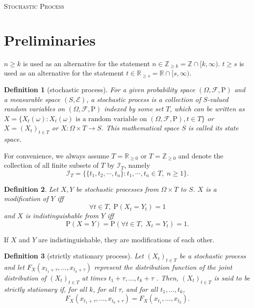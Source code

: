\documentclass{article}
\newtheorem{definition}{Definition}[section]
\theoremstyle{nonumberplain}
\begin{document}
	\begin{center}
	\textsc{\Huge Stochastic Process}	
\end{center}
\vspace{1em} 
\tableofcontents
\section{Preliminaries}
$n \ge k$ is used as an alternative for the
statement $n\in\mathbb{Z}_{\ge k}=\mathbb{Z}\cap[k,\infty)$. $t \ge s$ is used as an alternative for the statement $t\in\mathbb{R}_{\ge s}=\mathbb{R}\cap[s,\infty)$.
\begin{definition}[stochastic process]
For a given probability space $(\Omega ,{\mathcal{F}},\mathrm{P})$ and a measurable space $(S,\mathcal{E})$, a \emph{stochastic process} is a collection of $S$-valued random variables on $(\Omega ,{\mathcal{F}},\mathrm{P})$ indexed by some set $T$, which can be written as $X=\{X_t(\omega):X_t(\omega)\text{ is a random variable on } (\Omega ,\mathcal{F},\mathrm{P}),t\in T\}$ or $X=(X_t)_{t\in T}$ or $X:\Omega \times T\rightarrow S$. This mathematical space $S$ is called its state space. 
\end{definition}

For convenience, we always assume $T=\mathbb{R}_{\ge 0}$ or $T=\mathbb{Z}_{\ge 0}$ and denote the collection of all finite subsets of $T$ by $\mathcal{I}_T$, namely
\[
\mathcal{I}_T=\{\{t_1,t_2,\cdots,t_n\}:t_1,\cdots,t_n\in T,\;n\ge 1\}.
\]

\begin{definition}
Let $X, Y$ be stochastic processes from $\Omega\times T$ to $S$.
$X$ is a \emph{modification} of $Y$ iff
\[
\forall t \in T,\; \mathrm{P}(X_t=Y_t)=1
\]
and $X$ is \emph{indistinguishable} from $Y$ iff
\[
\mathrm{P}(X=Y)=\mathrm{P}(\forall t \in T,\; X_t=Y_t)=1.
\]
\end{definition}
If $X$ and $Y$ are indistinguishable, they are modifications of each other.


\begin{definition}[strictly stationary process]
	Let $(X_t)_{t\in T}$ be a stochastic process and let \newline $F_{{X}}(x_{{t_{1}+\tau }},\ldots ,x_{{t_{k}+\tau }})$ represent the  distribution function of the joint distribution of $(X_t)_{t\in T}$ at times $t_{1}+\tau ,\ldots ,t_{k}+\tau$ . Then, $(X_t)_{t\in T}$ is said to be strictly stationary if, for all $k$, for all $\tau$, and for all $ t_{1},\ldots ,t_{k}$,
	\[
	F_{{X}}(x_{{t_{1}+\tau }},\ldots ,x_{{t_{k}+\tau }})=F_{{X}}(x_{{t_{1}}},\ldots ,x_{{t_{k}}}).
	\]
\end{definition}
\end{document}
